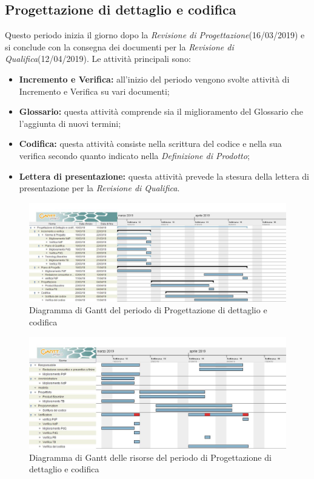 \newpage
\subsection{Progettazione di dettaglio e codifica}
Questo periodo inizia il giorno dopo la \textit{Revisione di Progettazione}(16/03/2019) e si conclude
con la consegna dei documenti per la \textit{Revisione di Qualifica}(12/04/2019). Le attività principali sono:
\begin{itemize}
	\item{\textbf{Incremento e Verifica:} all’inizio del periodo vengono svolte attività di Incremento e Verifica su vari documenti;}
	\item{\textbf{Glossario:} questa attività comprende sia il miglioramento del Glossario che l’aggiunta di nuovi termini;}
	\item{\textbf{Codifica:} questa attività consiste nella scrittura del codice e nella sua verifica secondo quanto indicato nella \textit{Definizione di Prodotto};}
	\item{\textbf{Lettera di presentazione:} questa attività prevede la stesura della lettera di presentazione per la \textit{Revisione di Qualifica}.}
\end{itemize}

\begin{figure}[h!]
	\centering
	\includegraphics[width=\textwidth]{Gantt_terza_fase.jpg}
	\caption{Diagramma di Gantt del periodo di Progettazione di dettaglio e codifica}
\end{figure}

\begin{figure}[h!]
	\centering
	\includegraphics[width=\textwidth]{Gantt_terza_fase_risorse.jpg}
	\caption{Diagramma di Gantt delle risorse del periodo di Progettazione di dettaglio e codifica}
\end{figure}

